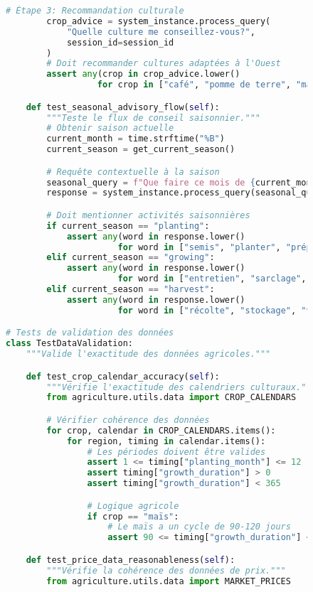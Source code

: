 \begin{figure}[h]
\begin{lstlisting}[language=Python, caption=Suite de tests d'intégration]
        # Étape 3: Recommandation culturale
        crop_advice = system_instance.process_query(
            "Quelle culture me conseillez-vous?",
            session_id=session_id
        )
        # Doit recommander cultures adaptées à l'Ouest
        assert any(crop in crop_advice.lower()
                  for crop in ["café", "pomme de terre", "maraîcher"])

    def test_seasonal_advisory_flow(self):
        """Teste le flux de conseil saisonnier."""
        # Obtenir saison actuelle
        current_month = time.strftime("%B")
        current_season = get_current_season()

        # Requête contextuelle à la saison
        seasonal_query = f"Que faire ce mois de {current_month}?"
        response = system_instance.process_query(seasonal_query)

        # Doit mentionner activités saisonnières
        if current_season == "planting":
            assert any(word in response.lower()
                      for word in ["semis", "planter", "préparer"])
        elif current_season == "growing":
            assert any(word in response.lower()
                      for word in ["entretien", "sarclage", "fertilisation"])
        elif current_season == "harvest":
            assert any(word in response.lower()
                      for word in ["récolte", "stockage", "vente"])

# Tests de validation des données
class TestDataValidation:
    """Valide l'exactitude des données agricoles."""

    def test_crop_calendar_accuracy(self):
        """Vérifie l'exactitude des calendriers culturaux."""
        from agriculture.utils.data import CROP_CALENDARS

        # Vérifier cohérence des données
        for crop, calendar in CROP_CALENDARS.items():
            for region, timing in calendar.items():
                # Les périodes doivent être valides
                assert 1 <= timing["planting_month"] <= 12
                assert timing["growth_duration"] > 0
                assert timing["growth_duration"] < 365

                # Logique agricole
                if crop == "maïs":
                    # Le maïs a un cycle de 90-120 jours
                    assert 90 <= timing["growth_duration"] <= 120

    def test_price_data_reasonableness(self):
        """Vérifie la cohérence des données de prix."""
        from agriculture.utils.data import MARKET_PRICES


\end{lstlisting}
\end{figure}
